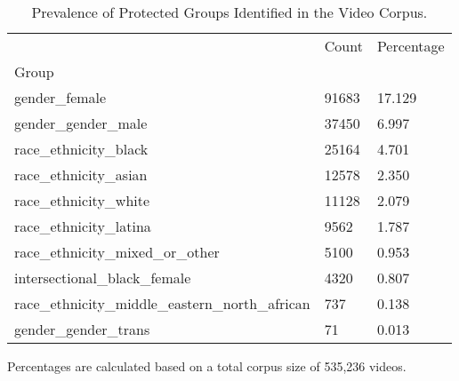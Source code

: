 \begin{table}[htbp]
\centering
\caption{Prevalence of Protected Groups Identified in the Video Corpus.}
\label{tab:eda-group-representation}
\begin{tabular}{lll}
\toprule
 & Count & Percentage \\
Group &  &  \\
\midrule
gender\_female & 91683 & 17.129 \\
gender\_gender\_male & 37450 & 6.997 \\
race\_ethnicity\_black & 25164 & 4.701 \\
race\_ethnicity\_asian & 12578 & 2.350 \\
race\_ethnicity\_white & 11128 & 2.079 \\
race\_ethnicity\_latina & 9562 & 1.787 \\
race\_ethnicity\_mixed\_or\_other & 5100 & 0.953 \\
intersectional\_black\_female & 4320 & 0.807 \\
race\_ethnicity\_middle\_eastern\_north\_african & 737 & 0.138 \\
gender\_gender\_trans & 71 & 0.013 \\
\bottomrule
\end{tabular}

\begin{tablenotes}[flushleft]
\item \small{Percentages are calculated based on a total corpus size of 535,236 videos.}
\end{tablenotes}
\end{table}